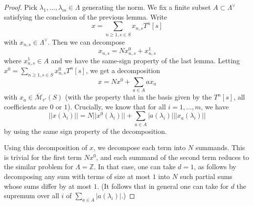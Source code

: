 \begin{proof}
  Pick $\lambda_1,\ldots,\lambda_m\in \Lambda$ generating the norm. We fix a finite subset $A\subset \Lambda^\vee$ satisfying the conclusion of the previous lemma. Write
  \[
  x=\sum_{n\geq 1, s\in S} x_{n,s} T^n [s]
  \]
  with $x_{n,s}\in \Lambda^\vee$. Then we can decompose
  \[
  x_{n,s} = N x_{n,s}^0 + x_{n,s}^1
  \]
  where $x_{n,s}^1\in A$ and we have the same-sign property of the last lemma. Letting $x^0 = \sum_{n\geq 1, s\in S} x_{n,s}^0 T^n [s]$, we get a decomposition
  \[
  x = Nx^0 + \sum_{a\in A} a x_a
  \]
  with $x_a\in \overline{\mathcal M}_{r'}(S)$ (with the property that in the
  basis given by the $T^n [s]$, all coefficients are $0$ or $1$). Crucially,
  we know that for all $i=1,\ldots,m$, we have
  \[
  ||x(\lambda_i)|| = N ||x^0(\lambda_i)|| + \sum_{a\in A} |a(\lambda_i)| ||x_a(\lambda_i)||
  \]
  by using the same sign property of the decomposition.

  Using this decomposition of $x$, we decompose each term into $N$ summands.
  This is trivial for the first term $Nx^0$,
  and each summand of the second term reduces to the similar problem for $\Lambda=\mathbb Z$.
  In that case, one can take $d=1$,
  as follows by decomposing any sum with terms of size at most $1$
  into $N$ such partial sums whose sums differ by at most $1$.
  (It follows that in general one can take for $d$
  the supremum over all $i$ of $\sum_{a\in A} |a(\lambda_i)|$.)
\end{proof}



